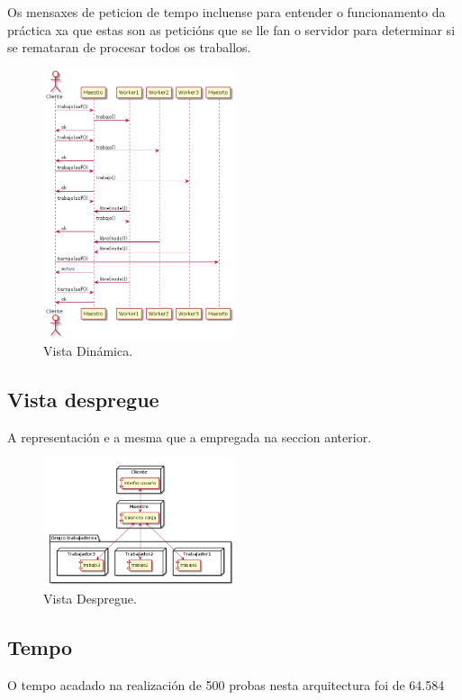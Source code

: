 \documentclass[DIV=calc,paper=a4,fontsize=11pt,onecolumn]{scrartcl}	 %
\begin{document}
Os mensaxes de peticion de tempo incluense para entender o funcionamento da práctica xa que estas son as peticións que se lle fan o servidor para determinar si se remataran de procesar todos os traballos.
\begin{figure}[!h]
\centering
\includegraphics[width = 0.5\textwidth]{./figuras/dinamicoMS.png}
\caption{Vista Dinámica.}
\label{fig:dinMS}
\end{figure}

\newpage
\subsection{Vista despregue}
A representación e a mesma que a empregada na seccion anterior.
\begin{figure}[!h]
\centering
\includegraphics[width = 0.5\textwidth]{./figuras/despMS.png}
\caption{Vista Despregue.}
\label{fig:despMS}
\end{figure}
\subsection{Tempo}
O tempo acadado na realización de 500 probas nesta arquitectura foi de 64.584
\end{document}
